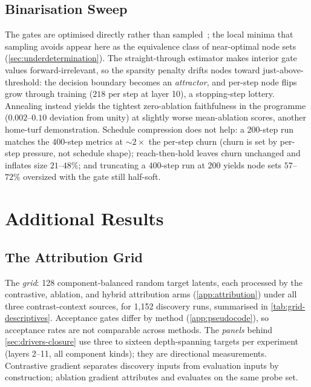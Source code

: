\documentclass[10pt]{article}
\begin{document}
\subsection{Binarisation Sweep}
The gates are optimised directly rather than sampled~\citep{louizos2018learning, li2024optimal}; the local minima that sampling avoids appear here as the equivalence class of near-optimal node sets (\cref{sec:underdetermination}).
The straight-through estimator makes interior gate values forward-irrelevant, so the sparsity penalty drifts nodes toward just-above-threshold: the decision boundary becomes an \emph{attractor}, and per-step node flips grow through training ($218$ per step at layer 10), a stopping-step lottery.
Annealing instead yields the tightest zero-ablation faithfulness in the programme ($0.002$--$0.10$ deviation from unity) at slightly worse mean-ablation scores, another home-turf demonstration.
Schedule compression does not help: a $200$-step run matches the $400$-step metrics at ${\sim}2\times$ the per-step churn (churn is set by per-step pressure, not schedule shape); reach-then-hold leaves churn unchanged and inflates size $21$--$48\%$; and truncating a $400$-step run at $200$ yields node sets $57$--$72\%$ oversized with the gate still half-soft.

\section{Additional Results}
\label{app:extra-results}
\subsection{The Attribution Grid}
\label{app:grid}
The \emph{grid}: 128 component-balanced random target latents, each processed by the contrastive, ablation, and hybrid attribution arms (\cref{app:attribution}) under all three contrast-context sources, for 1{,}152 discovery runs, summarised in \cref{tab:grid-descriptives}.
Acceptance gates differ by method (\cref{app:pseudocode}), so acceptance rates are not comparable across methods.
The \emph{panels} behind \cref{sec:drivers-closure} use three to sixteen depth-spanning targets per experiment (layers 2--11, all component kinds); they are directional measurements.
Contrastive gradient separates discovery inputs from evaluation inputs by construction; ablation gradient attributes and evaluates on the same probe set.
\end{document}
